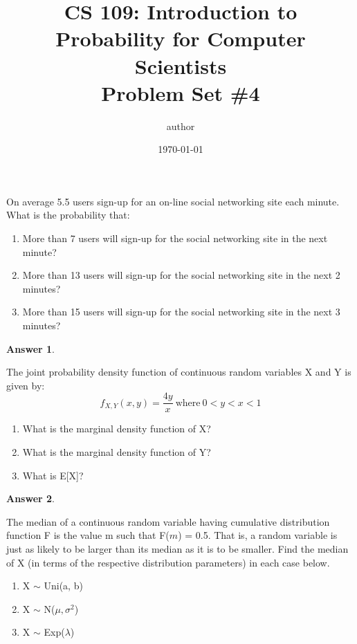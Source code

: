 \documentclass[12pt]{article}
\title{CS 109: Introduction to Probability for Computer Scientists\\Problem Set \#4}
\author{\Large{author}} %
\date{\Large{\today}} %
\renewcommand{\(}{\left(}
\renewcommand{\)}{\right)}
\theoremstyle{definition}
\newtheorem*{answer}{Answer}
\begin{document}
\maketitle
  
\begin{enumerate}
\large{
    \item On average 5.5 users sign-up for an on-line social networking site each minute. What is the probability that:
    \begin{enumerate}
        \item More than 7 users will sign-up for the social networking site in the next minute?
        \item More than 13 users will sign-up for the social networking site in the next 2 minutes?
        \item More than 15 users will sign-up for the social networking site in the next 3 minutes?
    \end{enumerate}
    
    \begin{shaded}
    \begin{answer}
    
    \end{answer}
    \end{shaded}
    \newpage
    \item The joint probability density function of continuous random variables X and Y is given by:
    \[
    f_{X,Y}(x,y) = \frac{4y}{x}\ \text{where}\ 0 < y < x < 1
    \]
    \begin{enumerate}
        \item What is the marginal density function of X?
        \item What is the marginal density function of Y?
        \item What is E[X]?
    \end{enumerate}
    
    \begin{shaded}
    \begin{answer}
    
    \end{answer}
    \end{shaded}
    \newpage
    \item The median of a continuous random variable having cumulative distribution function F is the value m such that F($m$) = 0.5. That is, a random variable is just as likely to be larger than its median as it is to be smaller. Find the median of X (in terms of the respective distribution parameters) in each case below.
    \begin{enumerate}
        \item X $\sim$ Uni(a, b)
        \item X $\sim$ N($\mu, \sigma^2$)
        \item X $\sim$ Exp($\lambda$)
    \end{enumerate}
    
}
\end{enumerate}
\end{document}
